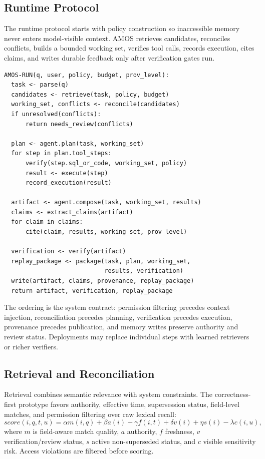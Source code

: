 \documentclass[sigconf,nonacm]{acmart}
\newcommand{\amos}{\textsc{AMOS}\xspace}
\begin{document}
\subsection{Runtime Protocol}
The runtime protocol starts with policy construction so inaccessible memory never enters model-visible context. \amos retrieves candidates, reconciles conflicts, builds a bounded working set, verifies tool calls, records execution, cites claims, and writes durable feedback only after verification gates run.

{\scriptsize
\begin{verbatim}
AMOS-RUN(q, user, policy, budget, prov_level):
  task <- parse(q)
  candidates <- retrieve(task, policy, budget)
  working_set, conflicts <- reconcile(candidates)
  if unresolved(conflicts):
      return needs_review(conflicts)

  plan <- agent.plan(task, working_set)
  for step in plan.tool_steps:
      verify(step.sql_or_code, working_set, policy)
      result <- execute(step)
      record_execution(result)

  artifact <- agent.compose(task, working_set, results)
  claims <- extract_claims(artifact)
  for claim in claims:
      cite(claim, results, working_set, prov_level)

  verification <- verify(artifact)
  replay_package <- package(task, plan, working_set,
                            results, verification)
  write(artifact, claims, provenance, replay_package)
  return artifact, verification, replay_package
\end{verbatim}
}

The ordering is the system contract: permission filtering precedes context injection, reconciliation precedes planning, verification precedes execution, provenance precedes publication, and memory writes preserve authority and review status. Deployments may replace individual steps with learned retrievers or richer verifiers.

\subsection{Retrieval and Reconciliation}
Retrieval combines semantic relevance with system constraints. The correctness-first prototype favors authority, effective time, supersession status, field-level matches, and permission filtering over raw lexical recall:
\begin{equation}
    score(i,q,t,u) = \alpha m(i,q) + \beta a(i) + \gamma f(i,t) + \delta v(i) + \eta s(i) - \lambda c(i,u),
\end{equation}
where $m$ is field-aware match quality, $a$ authority, $f$ freshness, $v$ verification/review status, $s$ active non-superseded status, and $c$ visible sensitivity risk. Access violations are filtered before scoring.
\end{document}
